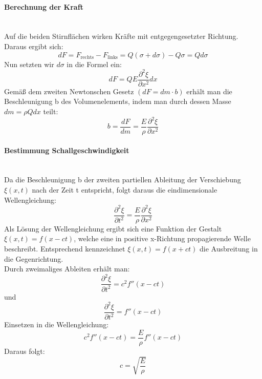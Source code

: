 \paragraph{Berechnung der Kraft}\mbox{}\\
Auf die beiden Stirnflächen wirken Kräfte mit entgegengesetzter Richtung.\\
Daraus ergibt sich: \\
\begin{equation}
  dF = F_\text{rechts} - F_\text{links} = Q (\sigma + d\sigma) - Q\sigma = Q d\sigma
\end{equation}
Nun setzten wir $d\sigma$ in die Formel ein:\\
\begin{equation}
  dF = QE \frac{\partial^2 \xi}{\partial x^2}  dx
\end{equation}
Gemäß dem zweiten Newtonschen Gesetz $(dF = dm \cdot b)$ erhält man die Beschleunigung b des Volumenelements, indem man durch dessen Masse $dm = \rho Q dx$ teilt:\\
\begin{equation}
  b = \frac{dF}{dm} = \frac{E}{\rho} \frac{\partial^2 \xi}{\partial x^2} 
\end{equation}
\paragraph{Bestimmung Schallgeschwindigkeit}\mbox{}\\
Da die Beschleunigung b der zweiten partiellen Ableitung der Verschiebung $\xi (x,t)$ nach der Zeit t entspricht, folgt daraus die eindimensionale Wellengleichung:\\
\begin{equation}
  \frac{\partial^2 \xi}{\partial t^2} = \frac{E}{\rho} \frac{\partial^2 \xi}{\partial x^2} 
\end{equation}
Als Lösung der Wellengleichung ergibt sich eine Funktion der Gestalt $\xi(x,t) = f(x - ct)$, welche eine in positive x-Richtung propagierende Welle beschreibt. Entsprechend kennzeichnet $\xi(x,t) = f(x + ct)$ die Ausbreitung in die Gegenrichtung.\\
Durch zweimaliges Ableiten erhält man:\\
\begin{equation}
  \frac{\partial^2 \xi}{\partial t^2} = c^2 f''(x - ct)
\end{equation}
und\\
\begin{equation}
  \frac{\partial^2 \xi}{\partial t^2} = f''(x - ct)
\end{equation}
Einsetzen in die Wellengleichung:\\
\begin{equation}
  c^2 f''(x - ct) = \frac{E}{\rho} f''(x - ct)
\end{equation}
Daraus folgt:
\begin{equation}
  c = \sqrt{\frac{E}{\rho}}
\end{equation}
